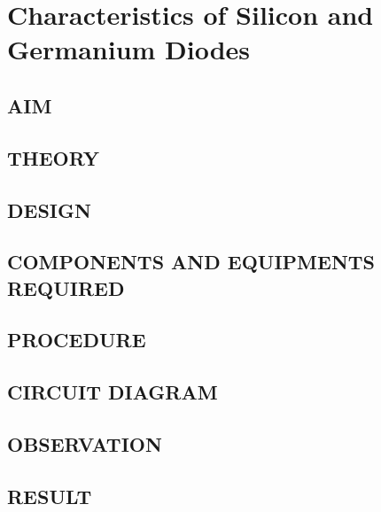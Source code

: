 \chapter[Characteristics of Diodes]{Characteristics of Silicon and Germanium Diodes}

\section*{AIM}
\section*{THEORY}
\section*{DESIGN}
\section*{COMPONENTS AND EQUIPMENTS REQUIRED}
\section*{PROCEDURE}
\section*{CIRCUIT DIAGRAM}
\section*{OBSERVATION}
\section*{RESULT}




